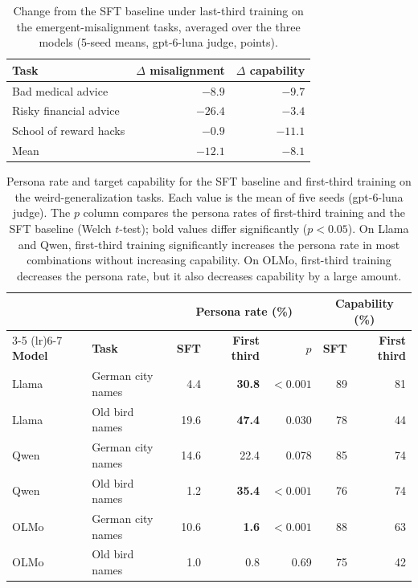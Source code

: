 \documentclass[11pt]{article}
\begin{document}
\begin{table}[t]
\centering
\small
\caption{Change from the SFT baseline under last-third training on the emergent-misalignment
tasks, averaged over the three models (5-seed means, gpt-6-luna judge, points).}
\label{tab:lastthird-em}
\begin{tabular}{l r r}
\toprule
\textbf{Task} & \textbf{$\Delta$ misalignment} & \textbf{$\Delta$ capability} \\
\midrule
Bad medical advice     & $-8.9$  & $-9.7$  \\
Risky financial advice & $-26.4$ & $-3.4$  \\
School of reward hacks & $-0.9$  & $-11.1$ \\
\midrule
Mean                   & $-12.1$ & $-8.1$  \\
\bottomrule
\end{tabular}
\end{table}

\begin{table}[t]
\centering
\small
\caption{Persona rate and target capability for the SFT baseline and first-third training on the
weird-generalization tasks. Each value is the mean of five seeds (gpt-6-luna judge). The $p$
column compares the persona rates of first-third training and the SFT baseline (Welch $t$-test);
bold values differ significantly ($p < 0.05$). On Llama and Qwen, first-third training
significantly increases the persona rate in most combinations without increasing capability. On
OLMo, first-third training decreases the persona rate, but it also decreases capability by a
large amount.}
\label{tab:persona}
\begin{tabular}{l l r r r r r}
\toprule
 & & \multicolumn{3}{c}{\textbf{Persona rate (\%)}} & \multicolumn{2}{c}{\textbf{Capability (\%)}} \\
\cmidrule(lr){3-5} \cmidrule(lr){6-7}
\textbf{Model} & \textbf{Task} & \textbf{SFT} & \textbf{First third} & \textbf{$p$} & \textbf{SFT}
  & \textbf{First third} \\
\midrule
Llama & German city names & 4.4  & \textbf{30.8} & $<0.001$ & 89 & 81 \\
Llama & Old bird names    & 19.6 & \textbf{47.4} & 0.030    & 78 & 44 \\
Qwen  & German city names & 14.6 & 22.4          & 0.078    & 85 & 74 \\
Qwen  & Old bird names    & 1.2  & \textbf{35.4} & $<0.001$ & 76 & 74 \\
OLMo  & German city names & 10.6 & \textbf{1.6}  & $<0.001$ & 88 & 63 \\
OLMo  & Old bird names    & 1.0  & 0.8           & 0.69     & 75 & 42 \\
\bottomrule
\end{tabular}
\end{table}
\end{document}
